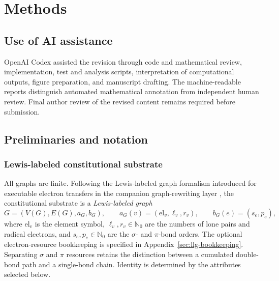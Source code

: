 \documentclass[pdflatex,sn-mathphys-num,referee,lineno]{sn-jnl}
\theoremstyle{plain}
\theoremstyle{remark}
\theoremstyle{definition}
\begin{document}
\section{Methods}
\label{sec:methods}

\subsection{Use of AI assistance}
OpenAI Codex assisted the revision through code and mathematical review,
implementation, test and analysis scripts, interpretation of computational
outputs, figure preparation, and manuscript drafting. The machine-readable
reports distinguish automated mathematical annotation from independent human
review. Final author review of the revised content remains required before
submission.

\subsection{Preliminaries and notation}
\label{sec:prelim}

\subsubsection{Lewis-labeled constitutional substrate}
\label{sec:notation}

All graphs are finite.  Following the Lewis-labeled graph formalism introduced
for executable electron transfers in the companion graph-rewriting layer
\cite{phan2026lwg}, the constitutional substrate is a
\emph{Lewis-labeled graph}
\begin{equation}
  G=(V(G),E(G),a_G,b_G),\qquad
  a_G(v)=(\mathrm{el}_v,\ell_v,r_v),\qquad
  b_G(e)=(s_e,p_e),
  \label{eq:llg}
\end{equation}
where \(\mathrm{el}_v\) is the element symbol, \(\ell_v,r_v\in\mathbb N_0\)
are the numbers of lone pairs and radical electrons, and
\(s_e,p_e\in\mathbb N_0\) are the \(\sigma\)- and \(\pi\)-bond orders.
The optional electron-resource bookkeeping is specified in
Appendix~\ref{sec:llg-bookkeeping}. Separating \(\sigma\) and \(\pi\) resources
retains the distinction between a cumulated double-bond path and a single-bond
chain. Identity is determined by the attributes selected below.
\end{document}
